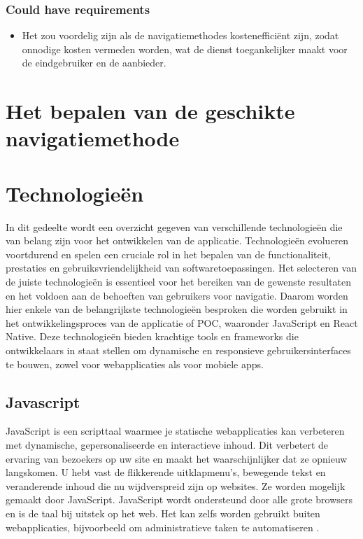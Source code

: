 \subsubsection{Could have requirements}
\begin{itemize}
    \item Het zou voordelig zijn als de navigatiemethodes kostenefficiënt zijn, zodat onnodige kosten vermeden worden, wat de dienst toegankelijker maakt voor de eindgebruiker en de aanbieder.
\end{itemize}

\section{Het bepalen van de geschikte navigatiemethode}
\label{sec:bepalen geschikte navigatiemethode}

\section{Technologieën}
\label{sec:technologieën}


In dit gedeelte wordt een overzicht gegeven van verschillende technologieën die van belang zijn voor het ontwikkelen van de applicatie. Technologieën evolueren voortdurend en spelen een cruciale rol in het bepalen van de functionaliteit, prestaties en gebruiksvriendelijkheid van softwaretoepassingen. Het selecteren van de juiste technologieën is essentieel voor het bereiken van de gewenste resultaten en het voldoen aan de behoeften van gebruikers voor navigatie. Daarom worden hier enkele van de belangrijkste technologieën besproken die worden gebruikt in het ontwikkelingsproces van de applicatie of POC, waaronder JavaScript en React Native. Deze technologieën bieden krachtige tools en frameworks die ontwikkelaars in staat stellen om dynamische en responsieve gebruikersinterfaces te bouwen, zowel voor webapplicaties als voor mobiele apps.

\subsection{Javascript}
\label{sec:javascript}


JavaScript is een scripttaal waarmee je statische webapplicaties kan verbeteren met dynamische, gepersonaliseerde en interactieve inhoud. Dit verbetert de ervaring van bezoekers op uw site en maakt het waarschijnlijker dat ze opnieuw langskomen. U hebt vast de flikkerende uitklapmenu's, bewegende tekst en veranderende inhoud die nu wijdverspreid zijn op websites. Ze worden mogelijk gemaakt door JavaScript. JavaScript wordt ondersteund door alle grote browsers en is de taal bij uitstek op het web. Het kan zelfs worden gebruikt buiten webapplicaties, bijvoorbeeld om administratieve taken te automatiseren \autocite{Wilton2004}.

